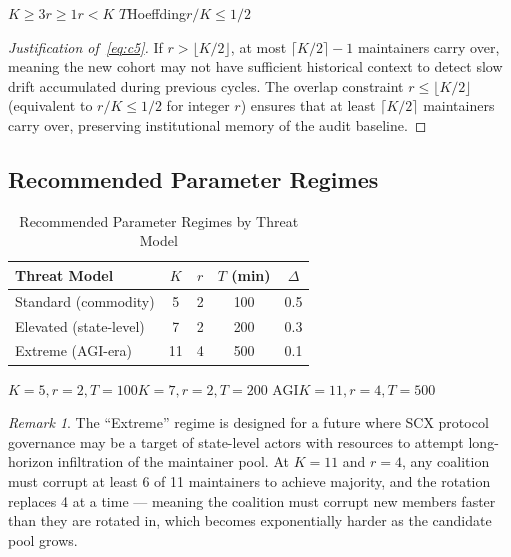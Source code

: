\documentclass[12pt,a4paper]{article}
\theoremstyle{remark}
\newtheorem{remark}[theorem]{Remark}
\begin{document}
\noindent\textbf{}
$K \geq 3$$r \geq 1$$r < K$
$T$Hoeffding$r/K \leq 1/2$


\begin{proof}[Justification of~\eqref{eq:c5}]
If $r > \lfloor K/2 \rfloor$, at most $\lceil K/2 \rceil - 1$ maintainers
carry over, meaning the new cohort may not have sufficient historical context
to detect slow drift accumulated during previous cycles. The overlap constraint
$r \leq \lfloor K/2 \rfloor$ (equivalent to $r/K \leq 1/2$ for integer $r$)
ensures that at least $\lceil K/2 \rceil$ maintainers carry over, preserving
institutional memory of the audit baseline.
\end{proof}

\subsection{Recommended Parameter Regimes}

\begin{table}[H]
\centering
\caption{Recommended Parameter Regimes by Threat Model}
\label{tab:params}
\begin{tabular}{@{}lcccc@{}}
\toprule
\textbf{Threat Model} & $K$ & $r$ & $T$ (min) & $\Delta$ \\
\midrule
Standard (commodity)        & 5  & 2  & 100 & 0.5 \\
Elevated (state-level)      & 7  & 2  & 200 & 0.3 \\
Extreme (AGI-era)           & 11 & 4  & 500 & 0.1 \\
\bottomrule
\end{tabular}
\end{table}

\noindent\textbf{}
$K=5, r=2, T=100$$K=7, r=2, T=200$
AGI$K=11, r=4, T=500$

\begin{remark}
The ``Extreme'' regime is designed for a future where SCX protocol governance
may be a target of state-level actors with resources to attempt long-horizon
infiltration of the maintainer pool. At $K=11$ and $r=4$, any coalition must
corrupt at least 6 of 11 maintainers to achieve majority, and the rotation
replaces 4 at a time — meaning the coalition must corrupt new members faster
than they are rotated in, which becomes exponentially harder as the candidate
pool grows.
\end{remark}

\newpage

\end{document}
